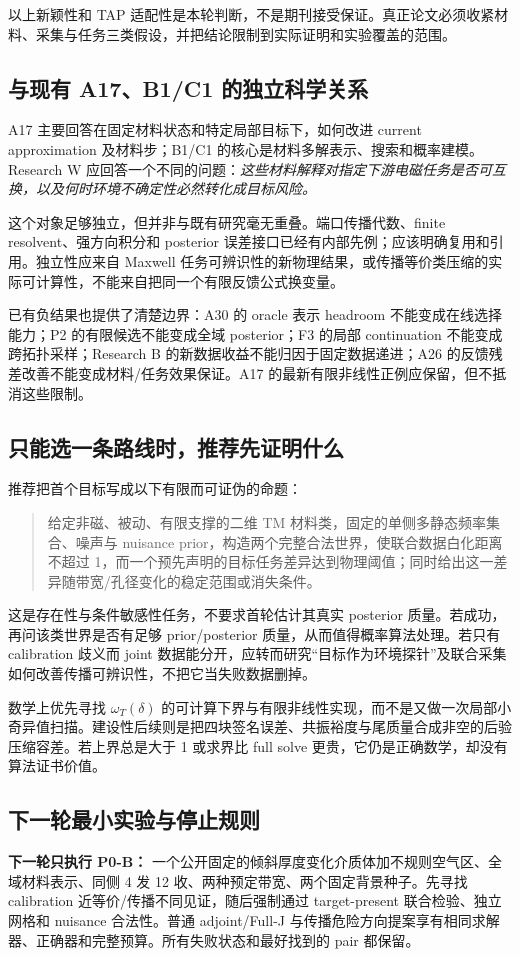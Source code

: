 以上新颖性和 TAP 适配性是本轮判断，不是期刊接受保证。真正论文必须收紧材料、采集与任务三类假设，并把结论限制到实际证明和实验覆盖的范围。

\subsection{与现有 A17、B1/C1 的独立科学关系}
A17 主要回答在固定材料状态和特定局部目标下，如何改进 current approximation 及材料步；B1/C1 的核心是材料多解表示、搜索和概率建模。Research W 应回答一个不同的问题：\emph{这些材料解释对指定下游电磁任务是否可互换，以及何时环境不确定性必然转化成目标风险。}

这个对象足够独立，但并非与既有研究毫无重叠。端口传播代数、finite resolvent、强方向积分和 posterior 误差接口已经有内部先例；应该明确复用和引用。独立性应来自 Maxwell 任务可辨识性的新物理结果，或传播等价类压缩的实际可计算性，不能来自把同一个有限反馈公式换变量。

已有负结果也提供了清楚边界：A30 的 oracle 表示 headroom 不能变成在线选择能力；P2 的有限候选不能变成全域 posterior；F3 的局部 continuation 不能变成跨拓扑采样；Research B 的新数据收益不能归因于固定数据递进；A26 的反馈残差改善不能变成材料/任务效果保证。A17 的最新有限非线性正例应保留，但不抵消这些限制。

\subsection{只能选一条路线时，推荐先证明什么}
推荐把首个目标写成以下有限而可证伪的命题：
\begin{quote}
给定非磁、被动、有限支撑的二维 TM 材料类，固定的单侧多静态频率集合、噪声与 nuisance prior，构造两个完整合法世界，使联合数据白化距离不超过 1，而一个预先声明的目标任务差异达到物理阈值；同时给出这一差异随带宽/孔径变化的稳定范围或消失条件。
\end{quote}
这是存在性与条件敏感性任务，不要求首轮估计其真实 posterior 质量。若成功，再问该类世界是否有足够 prior/posterior 质量，从而值得概率算法处理。若只有 calibration 歧义而 joint 数据能分开，应转而研究“目标作为环境探针”及联合采集如何改善传播可辨识性，不把它当失败数据删掉。

数学上优先寻找 $\omega_T(\delta)$ 的可计算下界与有限非线性实现，而不是又做一次局部小奇异值扫描。建设性后续则是把四块签名误差、共振裕度与尾质量合成非空的后验压缩容差。若上界总是大于 1 或求界比 full solve 更贵，它仍是正确数学，却没有算法证书价值。

\subsection{下一轮最小实验与停止规则}
\textbf{下一轮只执行 P0-B：} 一个公开固定的倾斜厚度变化介质体加不规则空气区、全域材料表示、同侧 4 发 12 收、两种预定带宽、两个固定背景种子。先寻找 calibration 近等价/传播不同见证，随后强制通过 target-present 联合检验、独立网格和 nuisance 合法性。普通 adjoint/Full-J 与传播危险方向提案享有相同求解器、正确器和完整预算。所有失败状态和最好找到的 pair 都保留。

